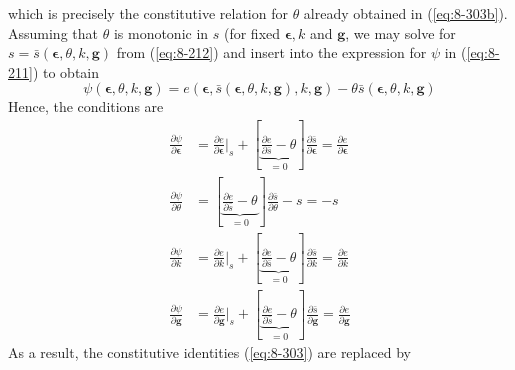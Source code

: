 which is precisely the constitutive relation for $\theta$ already obtained in (\ref{eq:8-303b}). Assuming that $\theta$ is monotonic in $s$ (for fixed $\bm{\epsilon},k$ and $\bm{g}$, we may solve for $s=\bar{s}(\bm{\epsilon},\theta,k,\bm{g})$ from (\ref{eq:8-212}) and insert into the expression for $\psi$ in (\ref{eq:8-211}) to obtain
\begin{equation}
    \psi(\bm{\epsilon},\theta,k,\bm{g}) = e(\bm{\epsilon},\bar{s}(\bm{\epsilon},\theta,k,\bm{g}),k,\bm{g}) - \theta \bar{s}(\bm{\epsilon},\theta,k,\bm{g})
\label{eq:8-213}
\end{equation}
Hence, the conditions are
\begin{subequations}\label{eq:8-214}
    \begin{align}
    \frac{\partial \psi}{\partial \bm{\epsilon}}
    &=
    \frac{\partial e}{\partial \bm{\epsilon}}|_{s} + \left[\underbrace{\frac{\partial e}{\partial \bar{s}} - \theta}_{=0} \right] \frac{\partial \bar{s}}{\partial \bm{\epsilon}} = \frac{\partial e}{\partial \bm{\epsilon}}
\label{eq:8-214a}\\
    \frac{\partial \psi}{\partial \theta}
    &=
    \left[\underbrace{\frac{\partial e}{\partial \bar{s}} - \theta}_{=0} \right] \frac{\partial \bar{s}}{\partial \theta} -s  = -s
\label{eq:8-214b} \\
    \frac{\partial \psi}{\partial k}
    &=
    \frac{\partial e}{\partial k}|_{s} + \left[\underbrace{\frac{\partial e}{\partial \bar{s}} - \theta}_{=0} \right] \frac{\partial \bar{s}}{\partial k} = \frac{\partial e}{\partial k}
\label{eq:8-214c} \\
    \frac{\partial \psi}{\partial \bm{g}}
    &=
    \frac{\partial e}{\partial \bm{g}}|_{s} + \left[\underbrace{\frac{\partial e}{\partial \bar{s}} - \theta}_{=0} \right] \frac{\partial \bar{s}}{\partial \bm{g}} = \frac{\partial e}{\partial \bm{g}}
\label{eq:8-214c}
    \end{align}
\end{subequations}
As a result, the constitutive identities (\ref{eq:8-303}) are replaced by
